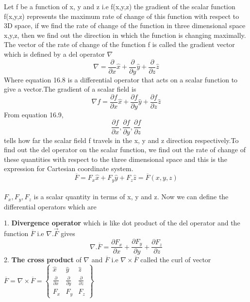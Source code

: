    Let f be a function of x, y and z i.e f(x,y,z) the gradient of the scalar function f(x,y,z) represents the maximum rate of change of this function with respect to 3D space, if we find the rate of change of the function in three dimensional space x,y,z, then we find out the direction in which the function is changing maximally. The vector of the rate of change of the function f is called the gradient vector which is defined by a del operator $\nabla$\\
   \begin{equation}
   \nabla = \frac{\partial}{\partial x}\hat{x} + \frac{\partial}{\partial y}\hat{y} + \frac{\partial}{\partial z}\hat{z}
   \end{equation} 
   Where equation 16.8 is a differential operator that acts on a scalar function to give a vector.The gradient of a scalar field is 
   \begin{equation}
  \nabla f = \frac{\partial f}{\partial x}\hat{x} + \frac{\partial f}{\partial y}\hat{y} + \frac{\partial f}{\partial z}\hat{z}
   \end{equation} 
   From equation 16.9,\begin{equation*}
  \frac{\partial f}{\partial x}, \frac{\partial f}{\partial y}, \frac{\partial f}{\partial z}
  \end{equation*}tells how far the scalar field f travels in the x, y and z direction respectively.To find out the del operator on the scalar function, we find out the rate of change of these quantities with respect to the three dimensional space and this is the expression for Cartesian coordinate system.
    \begin{equation}
   \overline{F}  =  F_{x}\hat{x} + F_{y}\hat{y} + F_{z}\hat{z}  =   \overline{F}(x,y,z)
   \end{equation}\\
   $F_{x}, F_{y}, F_{z}$ is a scalar quantity in terms of x, y and z. Now we can define the differential operators which are
   
   1. \textbf{Divergence operator} which is like dot product of the del operator and the function $\overline{F}$ i.e $\nabla.\overrightarrow{F}$ gives
   \begin{equation}
   \nabla.\overline{F} = \frac{\partial F_{x}}{\partial x} + \frac{\partial F_{y}}{\partial y} + \frac{\partial F_{z}}{\partial z}
   \end{equation}
  2. \textbf{The cross product} of $\nabla$ and $\overline{F}$ i.e $\nabla \times \overline{F}$ called the curl of vector
  $\overline{F} = \nabla \times \overline{F} = 
  \begin{Bmatrix}
  \hat{x} & \hat{y} & \hat{z}\\
  \frac{\partial}{\partial x} & \frac{\partial}{\partial y} & \frac{\partial}{\partial z}\\
  F_{x} & F_{y} & F_{z}
  \end{Bmatrix}$

